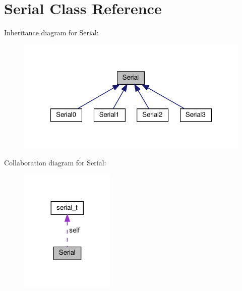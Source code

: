 \hypertarget{classSerial}{}\section{Serial Class Reference}
\label{classSerial}


Inheritance diagram for Serial\+:\nopagebreak
\begin{figure}[H]
\begin{center}
\leavevmode
\includegraphics[width=322pt]{classSerial__inherit__graph}
\end{center}
\end{figure}


Collaboration diagram for Serial\+:\nopagebreak
\begin{figure}[H]
\begin{center}
\leavevmode
\includegraphics[width=128pt]{classSerial__coll__graph}
\end{center}
\end{figure}
